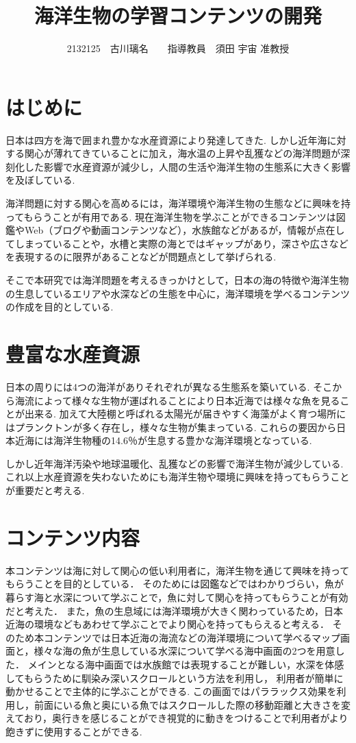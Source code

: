 \documentclass[twocolumn,a4j,10pt]{ltjsarticle}
\title{海洋生物の学習コンテンツの開発}
\author{2132125　古川璃名　　指導教員　須田 宇宙 准教授}
\date{}
\begin{document}
\maketitle

\section{はじめに}
\label{sec:description1}
日本は四方を海で囲まれ豊かな水産資源により発達してきた.
しかし近年海に対する関心が薄れてきている\cite{関心}ことに加え，海水温の上昇や乱獲などの海洋問題が深刻化した影響で水産資源が減少し，人間の生活や海洋生物の生態系に大きく影響を及ぼしている.\par
海洋問題に対する関心を高めるには，海洋環境や海洋生物の生態などに興味を持ってもらうことが有用である\cite{海洋環境}.
現在海洋生物を学ぶことができるコンテンツは図鑑やWeb（ブログや動画コンテンツなど），水族館などがあるが，情報が点在してしまっていることや，水槽と実際の海とではギャップがあり，深さや広さなどを表現するのに限界があることなどが問題点として挙げられる.\par
そこで本研究では海洋問題を考えるきっかけとして，日本の海の特徴や海洋生物の生息しているエリアや水深などの生態を中心に，海洋環境を学べるコンテンツの作成を目的としている.

\section{豊富な水産資源}
\label{sec:description2}
日本の周りには4つの海洋がありそれぞれが異なる生態系を築いている.
そこから海流によって様々な生物が運ばれることにより日本近海では様々な魚を見ることが出来る.
加えて大陸棚と呼ばれる太陽光が届きやすく海藻がよく育つ場所にはプランクトンが多く存在し，様々な生物が集まっている.
これらの要因から日本近海には海洋生物種の14.6％が生息する豊かな海洋環境となっている.\par
しかし近年海洋汚染や地球温暖化、乱獲などの影響で海洋生物が減少している.
これ以上水産資源を失わないためにも海洋生物や環境に興味を持ってもらうことが重要だと考える.

\section{コンテンツ内容}
\label{sec:description3}
本コンテンツは海に対して関心の低い利用者に，海洋生物を通じて興味を持ってもらうことを目的としている．
そのためには図鑑などではわかりづらい，魚が暮らす海と水深について学ぶことで，魚に対して関心を持ってもらうことが有効だと考えた．
また，魚の生息域には海洋環境が大きく関わっているため，日本近海の環境などもあわせて学ぶことでより関心を持ってもらえると考える．
そのため本コンテンツでは日本近海の海流などの海洋環境について学べるマップ画面と，様々な海の魚が生息している水深について学べる海中画面の2つを用意した．
 メインとなる海中画面では水族館では表現することが難しい，水深を体感してもらうために馴染み深いスクロールという方法を利用し， 利用者が簡単に動かせることで主体的に学ぶことができる. この画面ではパララックス効果を利用し，前面にいる魚と奥にいる魚ではスクロールした際の移動距離と大きさを変えており，奥行きを感じることができ視覚的に動きをつけることで利用者がより飽きずに使用することができる.
\end{document}
